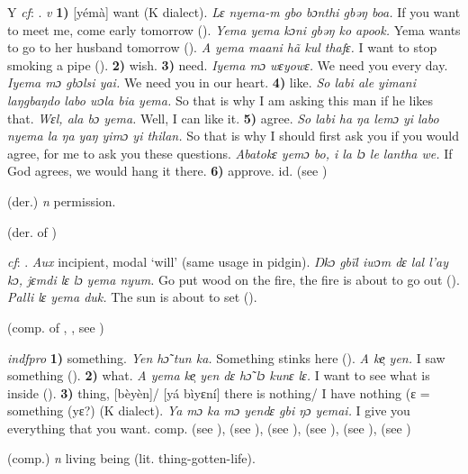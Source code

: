 \begin{letter}{Y}
 \textit{cf}: . \textit{v} \textbf{1)} [yémà] want (K dialect). \textit{Lɛ nyema-m gbo bɔnthi gbəŋ boa.} If you want to meet me, come early tomorrow (\citealt{Pichl1967}). \textit{Yema yema kɔni gbəŋ ko apook.} Yema wants to go to her husband tomorrow (\citealt{Pichl1967}). \textit{A yema maani hã kul thafɛ.} I want to stop smoking a pipe (\citealt{Pichl1967}). \textbf{2)} wish. \textbf{3)} need. \textit{Iyema mɔ wɛyowɛ.} We need you every day. \textit{Iyema mɔ gbɔlsi yai.} We need you in our heart. \textbf{4)} like. \textit{So labi ale yimani laŋgbaŋdo labo wɔla bia yema.} So that is why I am asking this man if he likes that. \textit{Wɛl, ala bɔ yema.} Well, I can like it. \textbf{5)} agree. \textit{So labi ha ŋa lemɔ yi labo nyema la ŋa yaŋ yimɔ yi thilan.} So that is why I should first ask you if you would agree, for me to ask you these questions. \textit{Abatokɛ yemɔ bo, i la lɔ le lantha we.} If God agrees, we would hang it there. \textbf{6)} approve. id.  (see ) 

 (der.) \textit{n} permission.

 (der. of )

 \textit{cf}: . \textit{Aux} incipient, modal ‘will' (same usage in pidgin). \textit{Ŋkɔ gbïl iwɔm dɛ lal l'ay kɔ, jɛmdi lɛ lɔ yema nyum.} Go put wood on the fire, the fire is about to go out (\citealt{Pichl1967}). \textit{Palli lɛ yema duk.} The sun is about to set (\citealt{Pichl1967}). 

 (comp. of , , see ) 

 \textit{indfpro} \textbf{1)} something. \textit{Yen hɔ̃ tun ka.} Something stinks here (\citealt{Pichl1967}). \textit{A ke̹ yen.} I saw something (\citealt{Pichl1967}). \textbf{2)} what. \textit{A yema ke̹ yen dɛ hɔ̃ lɔ kunɛ lɛ.} I want to see what is inside (\citealt{Pichl1967}). \textbf{3)} thing, [bèyèn]/ [yá bìyɛní] there is nothing/ I have nothing (ɛ = something (yɛ?) (K dialect). \textit{Ya mɔ ka mɔ yendɛ gbi ŋɔ yemai.} I give you everything that you want. comp.  (see ),  (see ),  (see ),  (see ),  (see ),  (see ) 

 (comp.) \textit{n} living being (lit. thing-gotten-life).


\end{letter}
